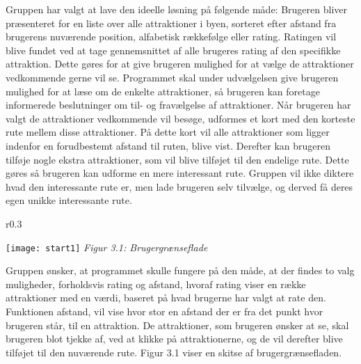 Gruppen har valgt at lave den ideelle løsning på følgende måde:\newline
\newline
Brugeren bliver præsenteret for en liste over alle attraktioner i byen, sorteret efter afstand fra brugerens nuværende position, alfabetisk rækkefølge eller rating. \newline
Ratingen vil blive fundet ved at tage gennemsnittet af alle brugeres rating af den specifikke attraktion. Dette gøres for at give brugeren mulighed for at vælge de attraktioner vedkommende gerne vil se.
\newline
Programmet skal under udvælgelsen give brugeren mulighed for at læse om de enkelte attraktioner, så brugeren kan foretage informerede beslutninger om til- og fravælgelse af attraktioner.\newline
\newline
Når brugeren har valgt de attraktioner vedkommende vil besøge, udformes et kort med den korteste rute mellem disse attraktioner. På dette kort vil alle attraktioner som ligger indenfor en forudbestemt afstand til ruten, blive vist. Derefter kan brugeren tilføje nogle ekstra attraktioner, som vil blive tilføjet til den endelige rute.\newline
Dette gøres så brugeren kan udforme en mere interessant rute. Gruppen vil ikke diktere hvad den interessante rute er, men lade brugeren selv tilvælge, og derved få deres egen unikke interessante rute. \newline 


\begin{wrapfigure}{r}{0.3\textwidth}
	\vspace{-20pt}
	\begin{center}
		\texttt{[image: start1]} \newline
		\textit{Figur 3.1: Brugergrænseflade}\newline
	\end{center}
	\vspace{-20pt}
	\vspace{-20pt}
\end{wrapfigure}


Gruppen ønsker, at programmet skulle fungere på den måde, at der findes to valg muligheder, forholdsvis rating og afstand, hvoraf rating viser en række attraktioner med en værdi, baseret på hvad brugerne har valgt at rate den. Funktionen afstand, vil vise hvor stor en afstand der er fra det punkt hvor brugeren står, til en attraktion. De attraktioner, som brugeren ønsker at se, skal brugeren blot tjekke af, ved at klikke på attraktionerne, og de vil derefter blive tilføjet til den nuværende rute. Figur 3.1 viser en skitse af brugergrænsefladen. \newline
\newline
\newline
\newline

